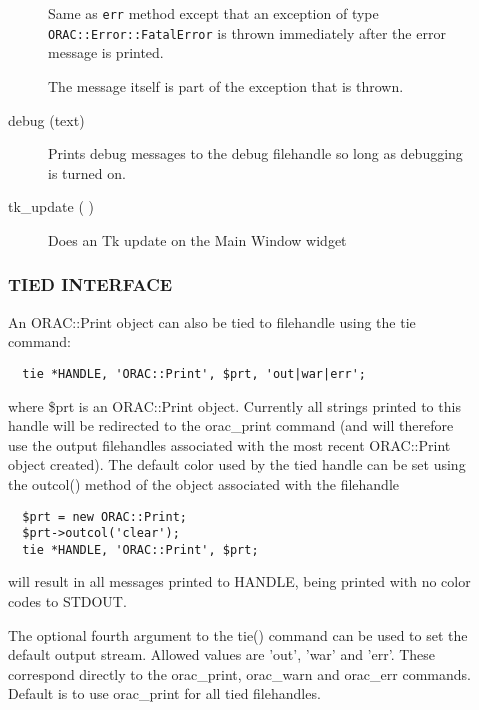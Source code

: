 \begin{description}
\begin{description}
Same as \texttt{err} method except that an exception of type
\texttt{ORAC::Error::FatalError} is thrown immediately after the error
message is printed.



The message itself is part of the exception that is thrown.


\item[{debug (text)}] \mbox{}

Prints debug messages to the debug filehandle so long as debugging
is turned on.


\item[{tk\_update ( )}] \mbox{}

Does an Tk update on the Main Window widget

\end{description}
\subsubsection*{TIED INTERFACE\label{ORAC::Print_TIED_INTERFACE}}


An ORAC::Print object can also be tied to filehandle using the
tie command:

\begin{verbatim}
  tie *HANDLE, 'ORAC::Print', $prt, 'out|war|err';
\end{verbatim}


where \$prt is an ORAC::Print object. Currently all strings printed
to this handle will be redirected to the orac\_print command
(and will therefore use the output filehandles associated with the
most recent ORAC::Print object created). The default color used
by the tied handle can be set using the outcol() method of the
object associated with the filehandle

\begin{verbatim}
  $prt = new ORAC::Print;
  $prt->outcol('clear');
  tie *HANDLE, 'ORAC::Print', $prt;
\end{verbatim}


will result in all messages printed to HANDLE, being printed
with no color codes to STDOUT.



The optional fourth argument to the tie() command can be used
to set the default output stream. Allowed values are 'out',
'war' and 'err'. These correspond directly to the orac\_print,
orac\_warn and orac\_err commands. Default is to use orac\_print
for all tied filehandles.




\end{description}
